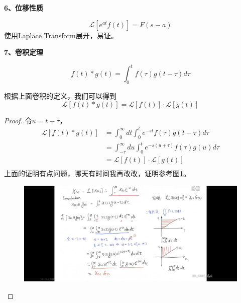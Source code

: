 \documentclass[lang=cn,10pt]{elegantbook}
\begin{document}
\textbf{6、位移性质}

\begin{equation}
	\mathcal{L}[e^{at}f(t)]=F(s-a)
\end{equation}
使用Laplace Transform展开，易证。

\textbf{7、卷积定理}

\begin{definition}[卷积]
	\begin{equation}
		f(t)*g(t)=\int_{0}^{t}f(\tau)g(t-\tau)d\tau
	\end{equation}
\end{definition}

根据上面卷积的定义，我们可以得到
\begin{equation}
	\mathcal{L}\left[f\left(t\right)*g\left(t\right)\right]=
	\mathcal{L}\left[f\left(t\right)\right]\cdot\mathcal{L}\left[g\left(t\right)\right]
\end{equation}
\begin{proof}
	令$u = t - \tau$，
	\begin{equation*}
		\begin{aligned}
			\mathcal{L}\left[f\left(t\right)*g\left(t\right)\right] & = \int_{0}^{\infty} dt\int_{0}^{t}e^{-st}f(\tau)g(t-\tau)d\tau                         \\
			                                                        & = \int_{-\tau}^{\infty} du\int_{0}^{t}e^{-s(u+\tau)}f(\tau)g(u)d\tau                   \\
			                                                        & =  \mathcal{L}\left[f\left(t\right)\right]\cdot\mathcal{L}\left[g\left(t\right)\right] \\
		\end{aligned}
	\end{equation*}
	上面的证明有点问题，哪天有时间我再改改，证明参考图\ref{im3_3}。
	\begin{figure}[hp]
		\centering
		\includegraphics[width = 12cm]{img/im3_3.jpg}
		\caption{}
		\label{im3_3}
	\end{figure}
\end{proof}
\end{document}
